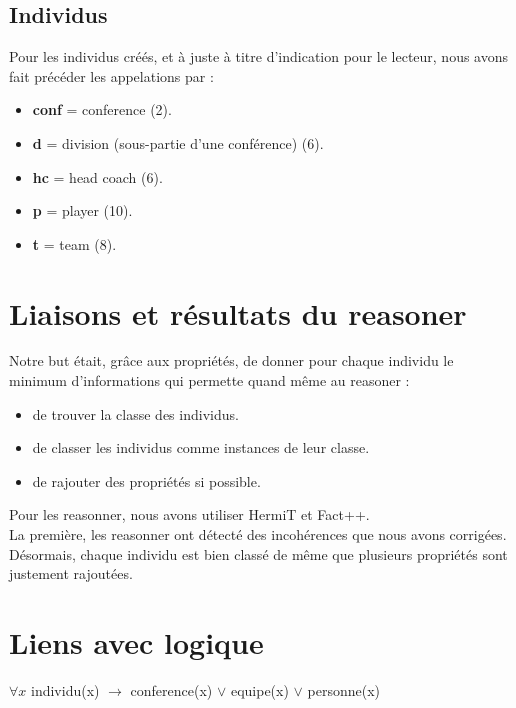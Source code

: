\documentclass[a4paper,11pt]{article}
\begin{document}
\subsection{Individus}

Pour les individus créés, et à juste à titre d'indication pour le lecteur, nous avons fait précéder les appelations par : \\
\begin{itemize}
    \item \textbf{conf} = conference (2).
    \item \textbf{d} = division (sous-partie d'une conférence) (6).
    \item \textbf{hc} = head coach (6).
    \item \textbf{p} = player (10).
    \item \textbf{t} = team (8). 
\end{itemize}

\section{Liaisons et résultats du reasoner}
\label{sec-3}

Notre but était, grâce aux propriétés, de donner pour chaque individu le minimum d'informations qui permette quand même au reasoner :

\begin{itemize}
    \item de trouver la classe des individus.
    \item de classer les individus comme instances de leur classe.
    \item de rajouter des propriétés si possible. \\
\end{itemize} 

Pour les reasonner, nous avons utiliser HermiT et Fact++. \\

La première, les reasonner ont détecté des incohérences que nous avons corrigées. \\

Désormais, chaque individu est bien classé de même que plusieurs propriétés sont justement rajoutées. \\


\section{Liens avec logique}
\label{sec-4}


$\forall x $ individu(x) $\rightarrow$ conference(x) $\vee$ equipe(x) $\vee$ personne(x)






\end{document}
